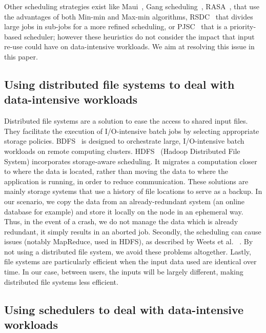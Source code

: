\documentclass[conference]{IEEEtran}
\begin{document}
Other scheduling strategies exist like 
Maui~\cite{Maui_Scheduler}, Gang scheduling~\cite{gang_scheduling}, 
RASA~\cite{rasa}, that use the advantages of both Min-min and Max-min algorithms,
RSDC~\cite{rsdc} that divides large jobs in sub-jobs for a more refined scheduling,
or PJSC~\cite{pjsc} that is a priority-based scheduler; 
however these heuristics do not consider the impact that
input re-use could have on data-intensive workloads.
We aim at resolving this issue in this paper.

\subsection{Using distributed file systems to deal with data-intensive workloads}

Distributed file systems are a solution to ease the access to 
shared input files.
They facilitate the execution of I/O-intensive batch
jobs by selecting appropriate storage policies.
BDFS~\cite{Explicit_Control_in_a_Batch-Aware_Distributed_File_System}
is designed to orchestrate large, I/O-intensive batch workloads on remote computing clusters.
HDFS~\cite{hdfs} (Hadoop Distributed File System)
incorporates storage-aware scheduling. 
It migrates a computation closer to where the data is
located, rather than moving the data to where the application is
running, in order to reduce communication.
These solutions are mainly storage systems that use a history of file locations to serve as a backup.
In our scenario, we copy the data from an already-redundant system (an online database for example)
and store it locally on the node in an ephemeral way.
Thus, in the event of a crash, we do not manage the data which is already redundant, it simply results in an aborted job.
Secondly, the scheduling can cause issues (notably MapReduce, used in HDFS), as described by Weets et al.
~\cite{issue_with_hdfs}.
By not using a distributed file system, we avoid these problems altogether.
Lastly, file systems are particularly efficient when the input data used are identical over time.
In our case, between users, the inputs will be largely different, making distributed file systems less efficient.

\subsection{Using schedulers to deal with data-intensive workloads}
\end{document}
